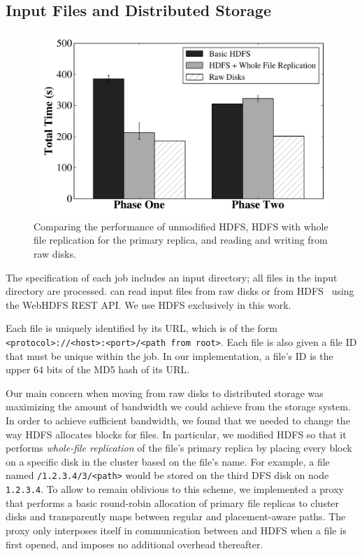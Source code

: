 \subsection{Input Files and Distributed Storage}
\label{sec:input_file_gathering}

\begin{figure}
  \centering
  \includegraphics[width=\columnwidth]{fault_tolerance/graphs/hdfs_no_proxy_penalty}
  \caption{\label{fig:hdfs_no_proxy_penalty} Comparing the performance of
    unmodified HDFS, HDFS with whole file replication for the primary replica,
    and reading and writing from raw disks.}
\end{figure}

The specification of each \themis job includes an input directory; all files in
the input directory are processed. \themis can read input files from raw disks
or from HDFS~\cite{hdfs} using the WebHDFS REST API. We use HDFS exclusively in
this work.

Each file is uniquely identified by its URL, which is of the form\\
\texttt{<protocol>://<host>:<port>/<path from root>}. Each file is also given a
file ID that must be unique within the job. In our implementation, a
file's ID is the upper 64 bits of the MD5 hash of its URL.

Our main concern when moving from raw disks to distributed storage was
maximizing the amount of bandwidth we could achieve from the storage system.
In order to achieve sufficient bandwidth, we found that we needed to change the
way HDFS allocates blocks for files. In particular, we modified HDFS so that it
performs \emph{whole-file replication} of the file's primary replica by placing
every block on a specific disk in the cluster based on the file's name. For
example, a file named \texttt{/1.2.3.4/3/<path>} would be stored on the third
DFS disk on node \texttt{1.2.3.4}. To allow \themis to remain oblivious to this
scheme, we implemented a proxy that performs a basic round-robin allocation of
primary file replicas to cluster disks and transparently maps between regular
and placement-aware paths. The proxy only interposes itself in communication
between \themis and HDFS when a file is first opened, and imposes no additional
overhead thereafter.

